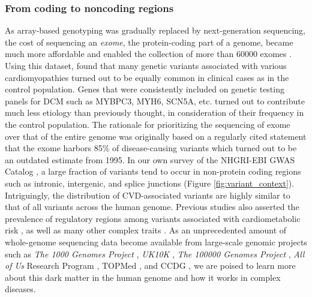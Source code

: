 \documentclass[letter]{bioinfo}
\begin{document}
\subsubsection*{From coding to noncoding regions}	
	As array-based genotyping was gradually replaced by next-generation sequencing, the cost of sequencing an \textit{exome}, the protein-coding part of a genome, became much more affordable and enabled the collection of more than 60000 exomes \citep{Lek:2016:Analysis}. Using this dataset, \cite{Walsh:2017:Reassessment} found that many genetic variants associated with various cardiomyopathies turned out to be equally common in clinical cases as in the control population. Genes that were consistently included on genetic testing panels for DCM such as MYBPC3, MYH6, SCN5A, etc. turned out to contribute much less etiology than previously thought, in consideration of their frequency in the control population.  The rationale for prioritizing the sequencing of exome over that of the entire genome was originally based on a regularly cited statement that the exome harbors 85\% of disease-causing variants \citep{Antonarakis:2001:nature} which turned out to be an outdated estimate from 1995. In our own survey of the NHGRI-EBI GWAS Catalog \citep{MacArthur:2017:new}, a large fraction of variants tend to occur in non-protein coding regions such as intronic, intergenic, and splice junctions (Figure \ref{fig:variant_context}). Intriguingly, the distribution of CVD-associated variants are highly similar to that of all variants across the human genome. Previous studies also asserted the prevalence of regulatory regions among variants associated with cardiometabolic risk \citep{Franzen:2016:Cardiometabolic}, as well as many other complex traits \citep{Pickrell:2014:Joint}. As an unprecedented amount of whole-genome sequencing data become available from large-scale genomic projects such as \textit{The 1000 Genomes Project} \citep{1000G:2015:global}, \textit{UK10K} \citep{TheUK10KConsortium:2015:UK10K}, \textit{The 100000 Genomes Project} \citep{Caulfield:2017:100K}, \textit{All of Us} Research Program \citep{NIH:2018:All}, TOPMed \citep{NHLBI:2014:TransOmics}, and CCDG \citep{NHGRI:2016:CCDG}, we are poised to learn more about this dark matter in the human genome and how it works in complex diseases.
\end{document}
